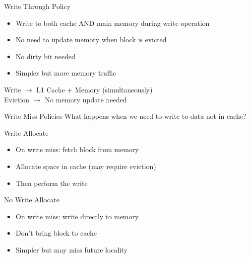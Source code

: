 \documentclass[aspectratio=169,12pt]{beamer}
\begin{document}
\begin{frame}{Write Through Policy}
\begin{itemize}
    \item Write to both cache AND main memory during write operation
    \item No need to update memory when block is evicted
    \item No dirty bit needed
    \item Simpler but more memory traffic
\end{itemize}

\begin{center}
\begin{tcolorbox}[colback=green!10, width=0.7\textwidth]
Write $\rightarrow$ L1 Cache + Memory (simultaneously)\\
Eviction $\rightarrow$ No memory update needed
\end{tcolorbox}
\end{center}
\end{frame}

\begin{frame}{Write Miss Policies}
What happens when we need to write to data not in cache?

\begin{block}{Write Allocate}
\begin{itemize}
    \item On write miss: fetch block from memory
    \item Allocate space in cache (may require eviction)
    \item Then perform the write
\end{itemize}
\end{block}

\begin{block}{No Write Allocate}
\begin{itemize}
    \item On write miss: write directly to memory
    \item Don't bring block to cache
    \item Simpler but may miss future locality
\end{itemize}
\end{block}
\end{frame}
\end{document}
